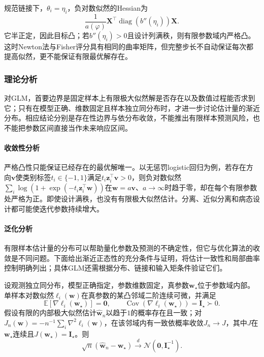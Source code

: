 规范链接下，$\theta_i=\eta_i$，负对数似然的Hessian为
\[
  \frac{1}{a(\varphi)}
  \bm{X}^{\top}\operatorname{diag}(b''(\eta_i))\bm{X}.
\]
它半正定，因此目标凸；若$b''(\eta_i)>0$且设计列满秩，则有限参数域内严格凸。这时Newton法与Fisher评分具有相同的曲率矩阵，但完整步长不自动保证每次都提高似然，更不能保证有限最优解存在。

\subsubsection{理论分析}
\label{sec:regression-glm-theory}

对GLM，首要边界是固定样本上有限极大似然解是否存在以及数值过程能否求到它；只有在模型正确、维数固定且样本独立同分布时，才进一步讨论估计量的渐近分布。相应结论分别是存在性边界与依分布收敛，不能推出有限样本预测风险，也不能把参数区间直接当作未来响应区间。

\paragraph{收敛性分析}
严格凸性只能保证已经存在的最优解唯一。以无惩罚logistic回归为例，若存在方向$\bm{v}$使类别标签$t_i\in\{-1,1\}$满足$t_i\bm{z}_i^{\top}\bm{v}>0$，则负对数似然$\sum_i\log(1+\exp(-t_i\bm{z}_i^{\top}\bm{w}))$在$\bm{w}=a\bm{v}$、$a\to\infty$时趋于零，却在每个有限参数处严格为正。即使设计满秩，也没有有限极大似然估计。分离、近似分离和病态设计都可能使迭代参数持续增大。

\paragraph{泛化分析}
有限样本估计量的分布可以帮助量化参数及预测的不确定性，但它与优化算法的收敛是不同问题。下面给出渐近正态性的充分条件与证明，将估计一致性和局部曲率控制明确列出；具体GLM还需根据分布、链接和输入矩条件验证它们。

\begin{theorem}[正则GLM估计的渐近正态性]
  \label{thm:regression-glm-asymptotic}
  设观测独立同分布，模型正确指定，参数维数固定，真参数$\bm{w}_{\star}$位于参数域内部。单样本对数似然$\ell_i(\bm{w})$在真参数的某凸邻域二阶连续可微，并满足
  \[
    \mathbb{E}[\nabla\ell_i(\bm{w}_{\star})]=\bm{0},\qquad
    \operatorname{Cov}(\nabla\ell_i(\bm{w}_{\star}))=\bm{I}_{\star}\succ0.
  \]
  假设有限的内部极大似然估计$\widehat{\bm{w}}_n$以趋于$1$的概率存在且一致；对$J_n(\bm{w})=-n^{-1}\sum_i\nabla^2\ell_i(\bm{w})$，在该邻域内有一致依概率收敛$J_n\to J$，其中$J$在$\bm{w}_{\star}$连续且$J(\bm{w}_{\star})=\bm{I}_{\star}$。则
  \[
    \sqrt n(\widehat{\bm{w}}_n-\bm{w}_{\star})
      \xrightarrow{d}\mathcal{N}(\bm{0},\bm{I}_{\star}^{-1}).
  \]
\end{theorem}

